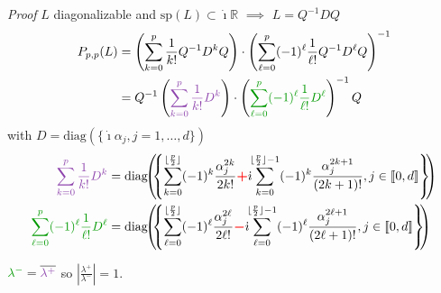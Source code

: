 \documentclass{beamer}
\newcommand{\I}{\dot{\imath}}
\newcommand{\Mvb}[1]{\boldsymbol{#1}}
\begin{document}
\begin{frame}{\emph{Proof}}
  $L$ diagonalizable and $\text{sp}(L)\subset\I\mathbb{R}$ $\implies$ $L = Q^{-1}DQ$
  $$
    \begin{aligned}
      P_{p,p}(L) &= \left(\sum_{k=0}^p \frac{1}{k!}Q^{-1}D^kQ\right)\cdot\left(\sum_{\ell=0}^p (-1)^\ell\frac{1}{\ell!}Q^{-1}D^\ell Q\right)^{-1}\\
                 &= Q^{-1}\left( \textcolor{violet}{\sum_{k=0}^p \frac{1}{k!}D^k} \right)\cdot\left(\textcolor{dgreen}{\sum_{\ell=0}^p (-1)^\ell\frac{1}{\ell!}D^\ell}\right)^{-1}Q
    \end{aligned}
  $$
  with $D = \text{diag}(\{ \I\alpha_j , j=1,\dots,d\})$
  $$
    \begin{aligned}
      \textcolor{violet}{\sum_{k=0}^p \frac{1}{k!}D^k} &= \text{diag}\!\!\left(\!\!\left\{ \sum_{k=0}^{\lfloor\frac{p}{2}\rfloor} (-1)^k\frac{\alpha_j^{2k}}{{2k}!} \textcolor{red}{\Mvb{+}}\I\!\!\sum_{k=0}^{\lfloor\frac{p}{2}\rfloor-1} (-1)^k \frac{\alpha_j^{2k+1}}{(2k+1)!} , j\in[\![0,d]\!] \right\}\!\!\right) \\
      \textcolor{dgreen}{\sum_{\ell=0}^p (-1)^\ell\frac{1}{\ell!}D^\ell} &= \text{diag}\!\!\left(\!\!\left\{ \sum_{\ell=0}^{\lfloor\frac{p}{2}\rfloor} (-1)^\ell\frac{\alpha_j^{2\ell}}{{2\ell}!} \textcolor{red}{\Mvb{-}}\I\!\!\sum_{\ell=0}^{\lfloor\frac{p}{2}\rfloor-1} (-1)^\ell \frac{\alpha_j^{2\ell+1}}{(2\ell+1)!} , j\in[\![0,d]\!] \right\}\!\!\right)
    \end{aligned}
  $$

  $\textcolor{dgreen}{\lambda^-} = \overline{\textcolor{violet}{\lambda^+}}$ so $\left|\frac{\lambda^+}{\lambda^-}\right|=1$.
\end{frame}
\end{document}
